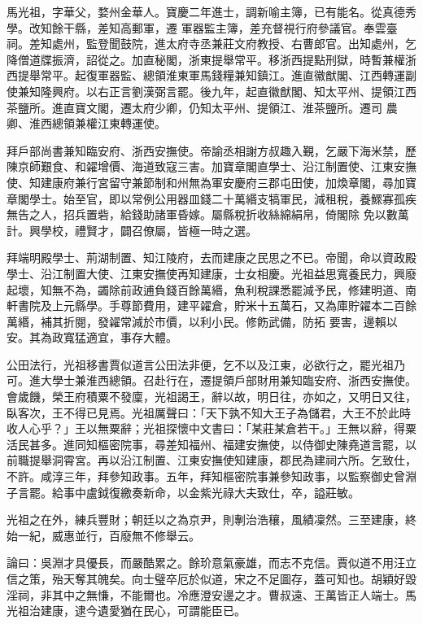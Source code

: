 \begin{pinyinscope}
 馬光祖，字華父，婺州金華人。寶慶二年進士，調新喻主簿，已有能名。從真德秀學。改知餘干縣，差知高郵軍，遷
 軍器監主簿，差充督視行府參議官。奉雲臺祠。差知處州，監登聞鼓院，進太府寺丞兼莊文府教授、右曹郎官。出知處州，乞降僧道牒振濟，詔從之。加直秘閣，浙東提舉常平。移浙西提點刑獄，時暫兼權浙西提舉常平。起復軍器監、總領淮東軍馬錢糧兼知鎮江。進直徽猷閣、江西轉運副使兼知隆興府。以右正言劉漢弼言罷。後九年，起直徽猷閣、知太平州、提領江西茶鹽所。進直寶文閣，遷太府少卿，仍知太平州、提領江、淮茶鹽所。遷司
 農卿、淮西總領兼權江東轉運使。



 拜戶部尚書兼知臨安府、浙西安撫使。帝諭丞相謝方叔趣入覲，乞嚴下海米禁，歷陳京師艱食、和糴增價、海道致寇三害。加寶章閣直學士、沿江制置使、江東安撫使、知建康府兼行宮留守兼節制和州無為軍安慶府三郡屯田使，加煥章閣，尋加寶章閣學士。始至官，即以常例公用器皿錢二十萬緡支犒軍民，減租稅，養鰥寡孤疾無告之人，招兵置砦，給錢助諸軍昏嫁。屬縣稅折收絲綿絹帛，倚閣除
 免以數萬計。興學校，禮賢才，闢召僚屬，皆極一時之選。



 拜端明殿學士、荊湖制置、知江陵府，去而建康之民思之不已。帝聞，命以資政殿學士、沿江制置大使、江東安撫使再知建康，士女相慶。光祖益思寬養民力，興廢起壞，知無不為，蠲除前政逋負錢百餘萬緡，魚利稅課悉罷減予民，修建明道、南軒書院及上元縣學。手尊節費用，建平糴倉，貯米十五萬石，又為庫貯糴本二百餘萬緡，補其折閱，發糴常減於市價，以利小民。修飭武備，防拓
 要害，邊賴以安。其為政寬猛適宜，事存大體。



 公田法行，光祖移書賈似道言公田法非便，乞不以及江東，必欲行之，罷光祖乃可。進大學士兼淮西總領。召赴行在，遷提領戶部財用兼知臨安府、浙西安撫使。會歲饑，榮王府積粟不發廩，光祖謁王，辭以故，明日往，亦如之，又明日又往，臥客次，王不得已見焉。光祖厲聲曰：「天下孰不知大王子為儲君，大王不於此時收人心乎？」王以無粟辭；光祖探懷中文書曰：「某莊某倉若干。」王無以辭，得粟
 活民甚多。進同知樞密院事，尋差知福州、福建安撫使，以侍御史陳堯道言罷，以前職提舉洞霄宮。再以沿江制置、江東安撫使知建康，郡民為建祠六所。乞致仕，不許。咸淳三年，拜參知政事。五年，拜知樞密院事兼參知政事，以監察御史曾淵子言罷。給事中盧鉞復繳奏新命，以金紫光祿大夫致仕，卒，謚莊敏。



 光祖之在外，練兵豐財；朝廷以之為京尹，則剸治浩穰，風績凜然。三至建康，終始一紀，威惠並行，百廢無不修舉云。



 論曰：吳淵才具優長，而嚴酷累之。餘玠意氣豪雄，而志不克信。賈似道不用汪立信之策，殆天奪其魄矣。向士璧卒厄於似道，宋之不足圖存，蓋可知也。胡穎好毀淫祠，非其中之無慊，不能爾也。冷應澄安邊之才。曹叔遠、王萬皆正人端士。馬光祖治建康，逮今遺愛猶在民心，可謂能臣已。



\end{pinyinscope}